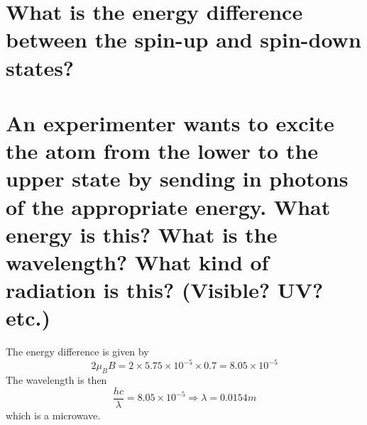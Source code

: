 \documentclass[answers]{exam}
\begin{document}
\begin{questions}

\begin{parts}
\part{What is the energy difference between the spin-up and spin-down states?}
\part{An experimenter wants to excite the atom from the lower to the upper state by sending in photons of the appropriate energy. What energy is this? What is the wavelength? What kind of radiation is this? (Visible? UV? etc.)}
\end{parts}

\begin{solution}
	The energy difference is given by
	$$2\mu_BB = 2\times5.75\times10^{-5}\times0.7 = 8.05\times10^{-5}$$
	The wavelength is then
	$$\frac{hc}{\lambda} = 8.05\times10^{-5} \Rightarrow \lambda = 0.0154\unit{m}$$
	which is a microwave.
\end{solution}
\end{questions}
\end{document}
